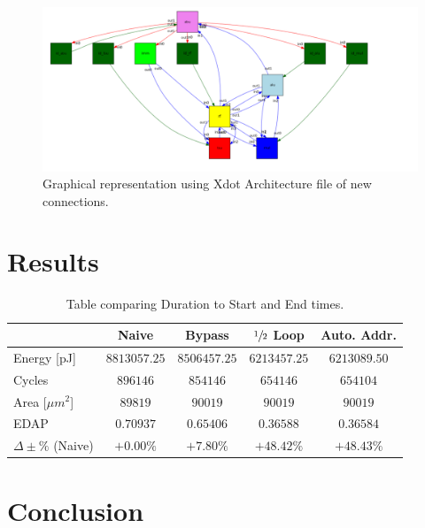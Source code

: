 \documentclass[letterpaper, 10 pt, conference]{ieeeconf}  %
\begin{document}
\begin{figure}[h]
\begin{center}
\includegraphics[scale=0.28]{images/arch.png}
\caption{Graphical representation using Xdot Architecture file of new connections.}
\label{fig:TODO2}
\end{center}
\end{figure}


\section{Results}

\begin{table}[h!]
\centering
\caption{Table comparing Duration to Start and End times.}
\label{tab:compare}
\vspace{5pt}
\centering
\begin{tabular}{|l|c|c|c|c|}
\rowcolor[HTML]{C0C0C0}
\hline
 & Naive & Bypass & $\sfrac{1}{2}$ Loop & Auto. Addr. \\ \hline
Energy [pJ] & $8813057.25$  & $8506457.25$ & $6213457.25$ & $6213089.50$ \\ \hline
Cycles & $896146$ & $854146$ & $654146$ & $654104$ \\ \hline
Area [$\mu m^2$] & $89819$ & $90019$ & $90019$ & $90019$ \\ \hline
EDAP & $0.70937$ & $0.65406$ & $0.36588$ & $0.36584$ \\ \hline
$\Delta\pm\%$ (Naive) & $+0.00\%$ & $+7.80\%$ & $+48.42\%$ & $+48.43\%$ \\ \hline

\end{tabular}
\end{table}

\section{Conclusion}
\end{document}
